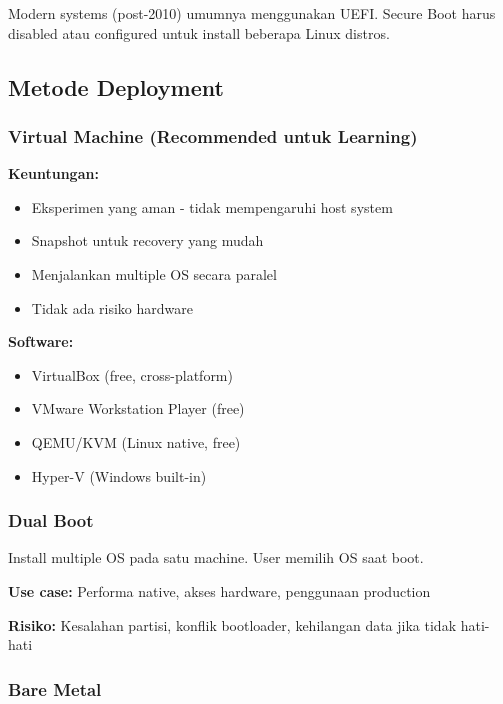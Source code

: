 \begin{warningbox}
Modern systems (post-2010) umumnya menggunakan UEFI. Secure Boot harus disabled atau configured untuk install beberapa Linux distros.
\end{warningbox}

\subsection{Metode Deployment}

\subsubsection{Virtual Machine (Recommended untuk Learning)}

\textbf{Keuntungan:}
\begin{itemize}
    \item Eksperimen yang aman - tidak mempengaruhi host system
    \item Snapshot untuk recovery yang mudah
    \item Menjalankan multiple OS secara paralel
    \item Tidak ada risiko hardware
\end{itemize}

\textbf{Software:}
\begin{itemize}
    \item VirtualBox (free, cross-platform)
    \item VMware Workstation Player (free)
    \item QEMU/KVM (Linux native, free)
    \item Hyper-V (Windows built-in)
\end{itemize}

\subsubsection{Dual Boot}

Install multiple OS pada satu machine. User memilih OS saat boot.

\textbf{Use case:} Performa native, akses hardware, penggunaan production

\textbf{Risiko:} Kesalahan partisi, konflik bootloader, kehilangan data jika tidak hati-hati

\subsubsection{Bare Metal}


